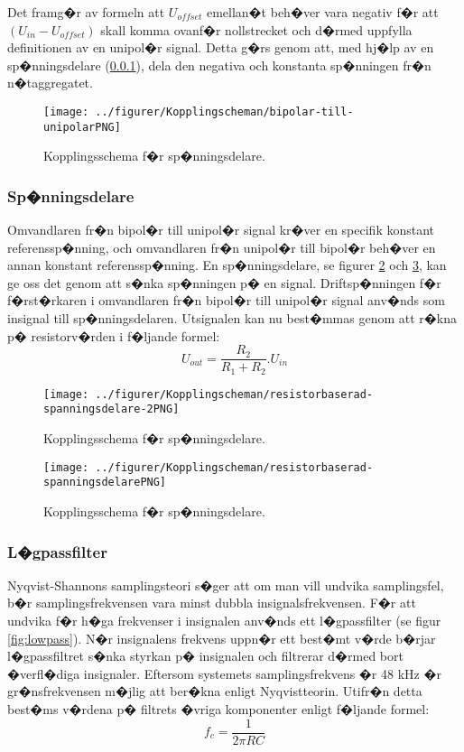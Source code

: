 \documentclass[a4paper]{article}
\begin{document}
Det framg�r av formeln att $U_{offset}$ emellan�t beh�ver vara negativ f�r att $(U_{in} - U_{offset})$ skall komma ovanf�r nollstrecket och d�rmed uppfylla definitionen av en unipol�r signal. Detta g�rs genom att, med hj�lp av en sp�nningsdelare (\ref{sec:spanning}), dela den negativa och konstanta sp�nningen fr�n n�taggregatet. 

\begin{figure}[h!]
  \centering
  \texttt{[image: ../figurer/Kopplingscheman/bipolar-till-unipolarPNG]}
  \caption{Kopplingsschema f�r sp�nningsdelare.}
  \label{fig:biuni}
\end{figure}

\subsubsection{Sp�nningsdelare}
\label{sec:spanning}
Omvandlaren fr�n bipol�r till unipol�r signal kr�ver en specifik konstant referenssp�nning, och omvandlaren fr�n unipol�r till bipol�r beh�ver en annan konstant referenssp�nning. En sp�nningsdelare, se figurer \ref{fig:spanning} och \ref{fig:spanning2}, kan ge oss det genom att s�nka sp�nningen p� en signal. Driftsp�nningen f�r f�rst�rkaren i omvandlaren fr�n bipol�r till unipol�r signal anv�nds som insignal till sp�nningsdelaren. Utsignalen kan nu best�mmas genom att r�kna p� resistorv�rden i f�ljande formel:
\newline
\[U_{out} = \frac{R_2}{R_1 + R_2} . U_{in}\]
\newline

\begin{figure}[h!]
  \centering
  \texttt{[image: ../figurer/Kopplingscheman/resistorbaserad-spanningsdelare-2PNG]}
  \caption{Kopplingsschema f�r sp�nningsdelare.}
  \label{fig:spanning}
\end{figure}

\begin{figure}[h!]
  \centering
  \texttt{[image: ../figurer/Kopplingscheman/resistorbaserad-spanningsdelarePNG]}
  \caption{Kopplingsschema f�r sp�nningsdelare.}
  \label{fig:spanning2}
\end{figure}

\subsubsection{L�gpassfilter}
Nyqvist-Shannons samplingsteori s�ger att om man vill undvika samplingsfel, b�r samplingsfrekvensen vara minst dubbla insignalsfrekvensen. F�r att undvika f�r h�ga frekvenser i insignalen anv�nds ett l�gpassfilter (se figur \ref{fig:lowpass}). N�r insignalens frekvens uppn�r ett best�mt v�rde b�rjar l�gpassfiltret s�nka styrkan p� insignalen och filtrerar d�rmed bort �verfl�diga insignaler. Eftersom systemets samplingsfrekvens �r 48 kHz �r gr�nsfrekvensen m�jlig att ber�kna enligt Nyqvistteorin. Utifr�n detta best�ms v�rdena p� filtrets �vriga komponenter enligt f�ljande formel:
\newline
\[f_c = \frac{1}{2\pi RC}\]
\newline
\end{document}
